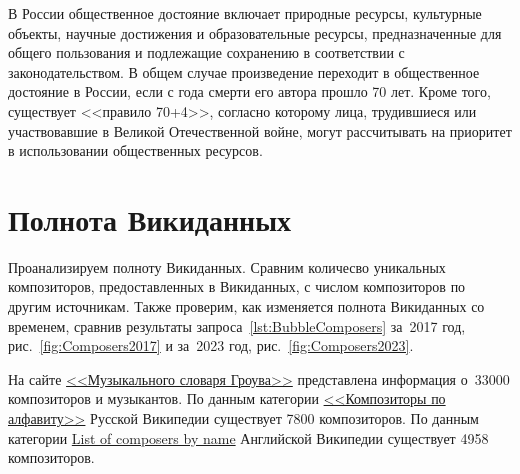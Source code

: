 В России общественное достояние включает природные ресурсы, культурные объекты, 
научные достижения и образовательные ресурсы, 
предназначенные для общего пользования и подлежащие сохранению в соответствии с законодательством. 
В общем случае произведение переходит в общественное достояние в России, 
если с года смерти его автора прошло 70 лет. 
Кроме того, существует <<правило 70+4>>, согласно которому лица, 
трудившиеся или участвовавшие в Великой Отечественной войне, 
могут рассчитывать на приоритет в использовании общественных ресурсов.            



\section{Полнота Викиданных}

Проанализируем полноту Викиданных. 
Сравним количесво уникальных композиторов, предоставленных в Викиданных, 
с числом композиторов по другим источникам. 
Также проверим, как изменяется полнота Викиданных со временем, 
сравнив результаты запроса~\ref{lst:BubbleComposers} за~2017 год, 
рис.~\ref{fig:Composers2017} и за~2023 год, рис.~\ref{fig:Composers2023}.

На сайте  
\href{https://ru.wikipedia.org/?curid=1362802}
     {<<Музыкального словаря Гроува>>} 
представлена информация о~\num{33000} композиторов и музыкантов. 
По данным категории 
\href{https://ru.wikipedia.org/?curid=155531}
     {<<Композиторы по алфавиту>>} 
Русской Википедии существует \num{7800} композиторов. 
По данным категории 
\href{https://en.wikipedia.org/?curid=6921880}
     {List of composers by name} 
Английской Википедии существует \num{4958} композиторов.


